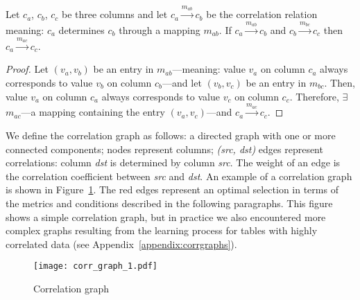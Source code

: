 \begin{theorem}
\label{subsec:ps:corr:theorem1}
Let \(c_{a}\), \(c_{b}\), \(c_{c}\) be three columns and let \(c_{a} \xrightarrow{m_{ab}} c_{b}\) be the correlation relation meaning: \(c_{a}\) determines \(c_{b}\) through a mapping \(m_{ab}\). If \(c_{a} \xrightarrow{m_{ab}} c_{b}\) and \(c_{b} \xrightarrow{m_{bc}} c_{c}\) then \(c_{a} \xrightarrow{m_{ac}} c_{c}\).
\end{theorem}
\begin{proof}
Let \((v_{a}, v_{b})\) be an entry in \(m_{ab}\)---meaning: value \(v_{a}\) on column \(c_{a}\) always corresponds to value \(v_{b}\) on column \(c_{b}\)---and let \((v_{b}, v_{c})\) be an entry in \(m_{bc}\). Then, value \(v_{a}\) on column \(c_{a}\) always corresponds to value \(v_{c}\) on column \(c_{c}\). Therefore, \(\exists\) \(m_{ac}\)---a mapping containing the entry \((v_{a}, v_{c})\)---and \(c_{a} \xrightarrow{m_{ac}} c_{c}\).
\end{proof}

We define the correlation graph as follows: a directed graph with one or more connected components; nodes represent columns; \textit{(src, dst)} edges represent correlations: column \textit{dst} is determined by column \textit{src}. The weight of an edge is the correlation coefficient between \textit{src} and \textit{dst}. An example of a correlation graph is shown in Figure~\ref{fig:ps:columncorrelation:corrgraph1}. The red edges represent an optimal selection in terms of the metrics and conditions described in the following paragraphs. This figure shows a simple correlation graph, but in practice we also encountered more complex graphs resulting from the learning process for tables with highly correlated data (see Appendix~\ref{appendix:corrgraphs}).

\begin{figure}[h]
  \centering
  \texttt{[image: corr\_graph\_1.pdf]}
  \caption{Correlation graph}
  \label{fig:ps:columncorrelation:corrgraph1}
\end{figure}

